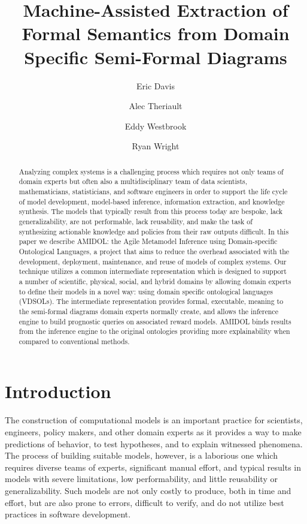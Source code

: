 \documentclass[11pt]{article}
\date{\vspace{-5ex}}
\author{Eric Davis}
\author{Alec Theriault}
\author{Eddy Westbrook}
\author{Ryan Wright}
\affil{Galois, Inc}
\title{Machine-Assisted Extraction of Formal Semantics from Domain Specific Semi-Formal Diagrams}
\newcommand{\amidol}{\textsc{AMIDOL}}
\begin{document}
\maketitle
\vspace{10pt}
\begin{abstract}
Analyzing complex systems is a challenging process which requires not only teams of domain experts but often also a multidisciplinary team of data scientists, mathematicians, statisticians, and software engineers in order to support the life cycle of model development, model-based inference, information extraction, and knowledge synthesis.  The models that typically result from this process today are bespoke, lack generalizability, are not performable, lack reusability, and make the task of synthesizing actionable knowledge and policies from their raw outputs difficult.  In this paper we describe \amidol{}: the Agile Metamodel Inference using Domain-specific Ontological Languages, a project that aims to reduce the overhead associated with the development, deployment, maintenance, and reuse of models of complex systems.  Our technique utilizes a common intermediate representation which is designed to support a number of scientific, physical, social, and hybrid domains by allowing domain experts to define their models in a novel way: using domain specific ontological languages (VDSOLs).  The intermediate representation provides formal, executable, meaning to the semi-formal diagrams domain experts normally create, and allows the inference engine to build prognostic queries on associated reward models.  \amidol{} binds results from the inference engine to the original ontologies providing more explainability when compared to conventional methods.
\end{abstract}

\section{Introduction}

The construction of computational models is an important practice for scientists, engineers, policy makers, and other domain experts as it provides a way to make predictions of behavior, to test hypotheses, and to explain witnessed phenomena.  The process of building suitable models, however, is a laborious one which requires diverse teams of experts, significant manual effort, and typical results in models with severe limitations, low performability, and little reusability or generalizability.  Such models are not only costly to produce, both in time and effort, but are also prone to errors, difficult to verify, and do not utilize best practices in software development.
\end{document}
